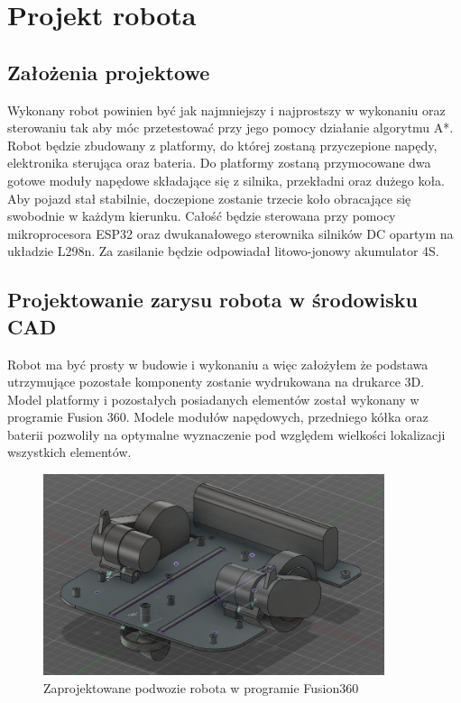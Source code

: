 \section{Projekt robota}
\subsection{Założenia projektowe}
Wykonany robot powinien być jak najmniejszy i najprostszy w wykonaniu oraz sterowaniu tak aby móc przetestować przy jego pomocy działanie algorytmu A*. 
Robot będzie zbudowany z platformy, do której zostaną przyczepione napędy, elektronika sterująca oraz bateria. 
Do platformy zostaną przymocowane dwa gotowe moduły napędowe składające się z silnika, przekładni oraz dużego koła. 
Aby pojazd stał stabilnie, doczepione zostanie trzecie koło obracające się swobodnie w każdym kierunku.
Całość będzie sterowana przy pomocy mikroprocesora ESP32 oraz dwukanałowego sterownika silników DC opartym na układzie L298n.
Za zasilanie będzie odpowiadał litowo-jonowy akumulator 4S.

\subsection{Projektowanie zarysu robota w środowisku CAD}
Robot ma być prosty w budowie i wykonaniu a więc założyłem że podstawa utrzymujące pozostałe komponenty
zostanie wydrukowana na drukarce 3D. Model platformy i pozostałych posiadanych elementów został wykonany w programie Fusion 360.
Modele modułów napędowych, przedniego kółka oraz baterii pozwoliły na optymalne wyznaczenie pod względem wielkości lokalizacji wszystkich elementów.


\begin{figure}[H]
	\centering
	\includegraphics[width=10cm]{pages/robot/zdjecia/robotModelCaly.png}
	\caption{Zaprojektowane podwozie robota w programie Fusion360}
	\label{fig:Rys}
\end{figure}

